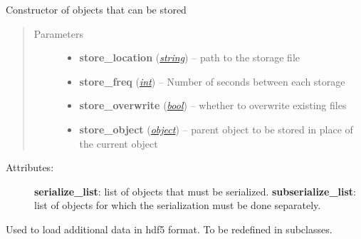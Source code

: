 \documentclass[a4paper,10pt,english]{sphinxmanual}
\begin{document}
\begin{fulllineitems}
\label{api-core:TensorToolbox.core.storable_object}
Constructor of objects that can be stored
\begin{quote}\begin{description}
\item[{Parameters}] \leavevmode\begin{itemize}
\item {} 
\textbf{store\_location} (\href{http://docs.python.org/library/string.html\#module-string}{\emph{string}}) -- path to the storage file

\item {} 
\textbf{store\_freq} (\href{http://docs.python.org/library/functions.html\#int}{\emph{int}}) -- Number of seconds between each storage

\item {} 
\textbf{store\_overwrite} (\href{http://docs.python.org/library/functions.html\#bool}{\emph{bool}}) -- whether to overwrite existing files

\item {} 
\textbf{store\_object} (\href{http://docs.python.org/library/functions.html\#object}{\emph{object}}) -- parent object to be stored in place of the current object

\end{itemize}

\end{description}\end{quote}
\begin{description}
\item[{Attributes:}] \leavevmode
\textbf{serialize\_list}: list of objects that must be serialized.
\textbf{subserialize\_list}: list of objects for which the serialization must be done separately.

\end{description}

\begin{fulllineitems}
\label{api-core:TensorToolbox.core.storable_object.h5load}
Used to load additional data in hdf5 format. To be redefined in subclasses.

\end{fulllineitems}


\end{fulllineitems}
\end{document}
